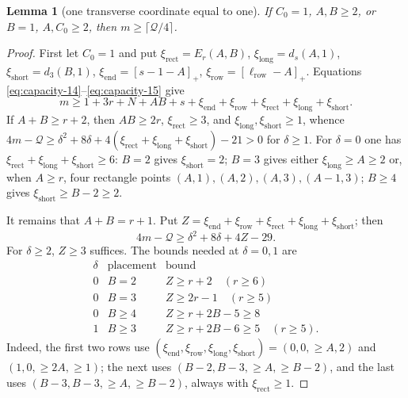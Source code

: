\documentclass[11pt]{article}
\newtheorem{lemma}[theorem]{Lemma}
\theoremstyle{definition}
\theoremstyle{remark}
\theoremstyle{plain}
\begin{document}
\begin{lemma}[one transverse coordinate equal to one]\label{res:A3.4}
If $C_0=1$, $A,B\ge2$, or $B=1$, $A,C_0\ge2$, then
$m\ge\lceil \mathcal Q/4\rceil$.
\end{lemma}
\begin{proof}
First let $C_0=1$ and put
$\xi_{\mathrm{rect}}=E_r(A,B)$, $\xi_{\mathrm{long}}=d_s(A,1)$, $\xi_{\mathrm{short}}=d_3(B,1)$,
$\xi_{\mathrm{end}}=[s-1-A]_+$, $\xi_{\mathrm{row}}=[\ell_{\mathrm{row}}-A]_+$.  Equations \eqref{eq:capacity-14}--\eqref{eq:capacity-15} give
\[
 m\ge1+3r+N+AB+s+\xi_{\mathrm{end}}+\xi_{\mathrm{row}}+\xi_{\mathrm{rect}}+\xi_{\mathrm{long}}+\xi_{\mathrm{short}}.\tag{3.18}\label{eq:capacity-18}
\]
If $A+B\ge r+2$, then $AB\ge2r$, $\xi_{\mathrm{rect}}\ge3$, and $\xi_{\mathrm{long}},\xi_{\mathrm{short}}\ge1$, whence
$4m-\mathcal Q\ge \delta^2+8\delta+4(\xi_{\mathrm{rect}}+\xi_{\mathrm{long}}+\xi_{\mathrm{short}})-21>0$ for $\delta\ge1$.
For $\delta=0$ one has $\xi_{\mathrm{rect}}+\xi_{\mathrm{long}}+\xi_{\mathrm{short}}\ge6$: $B=2$ gives $\xi_{\mathrm{short}}=2$;
$B=3$ gives either $\xi_{\mathrm{long}}\ge A\ge2$ or, when $A\ge r$, four rectangle
points $(A,1),(A,2),(A,3),(A-1,3)$; $B\ge4$ gives $\xi_{\mathrm{short}}\ge B-2\ge2$.

It remains that $A+B=r+1$.  Put $Z=\xi_{\mathrm{end}}+\xi_{\mathrm{row}}+\xi_{\mathrm{rect}}+\xi_{\mathrm{long}}+\xi_{\mathrm{short}}$; then
\[
 4m-\mathcal Q\ge \delta^2+8\delta+4Z-29.\tag{3.19}\label{eq:capacity-19}
\]
For $\delta\ge2$, $Z\ge3$ suffices.  The bounds needed at $\delta=0,1$ are
\[
\begin{array}{c|c|c}
\delta&\text{placement}&\text{bound}\\\hline
0&B=2&Z\ge r+2\quad(r\ge6)\\
0&B=3&Z\ge2r-1\quad(r\ge5)\\
0&B\ge4&Z\ge r+2B-5\ge8\\
1&B\ge3&Z\ge r+2B-6\ge5\quad(r\ge5).
\end{array}
\]
Indeed, the first two rows use $(\xi_{\mathrm{end}},\xi_{\mathrm{row}},\xi_{\mathrm{long}},\xi_{\mathrm{short}})=(0,0,\ge A,2)$ and
$(1,0,\ge2A,\ge1)$; the next uses
$(B-2,B-3,\ge A,\ge B-2)$, and the last uses
$(B-3,B-3,\ge A,\ge B-2)$, always with $\xi_{\mathrm{rect}}\ge1$.


\end{proof}
\end{document}

